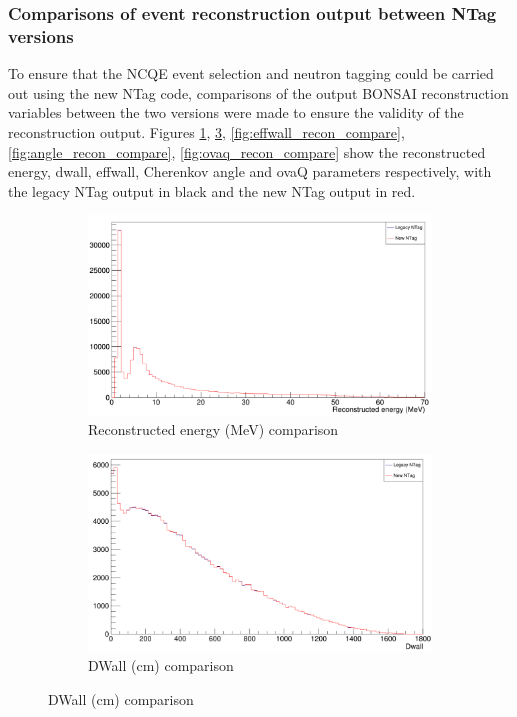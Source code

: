 \subsubsection{Comparisons of event reconstruction output between NTag versions}
To ensure that the NCQE event selection and neutron tagging could be carried out using the new NTag code, comparisons of the output BONSAI reconstruction variables between the two versions were made to ensure the validity of the reconstruction output. Figures \ref{fig:energy_recon_compare}, \ref{fig:dwall_recon_compare}, \ref{fig:effwall_recon_compare}, \ref{fig:angle_recon_compare}, \ref{fig:ovaq_recon_compare} show the reconstructed energy, dwall, effwall, Cherenkov angle and ovaQ parameters respectively, with the legacy NTag output in black and the new NTag output in red. 

\begin{figure}[t!] %
    \begin{subfigure}{0.48\textwidth}
    \includegraphics[width=\linewidth]{Figures/energy_recon_compare.PNG}
    \caption{Reconstructed energy (MeV) comparison} \label{fig:energy_recon_compare}
    \end{subfigure}\hspace*{\fill}
    \begin{subfigure}{0.48\textwidth}
    \includegraphics[width=\linewidth]{Figures/dwall_recon_compare.PNG}
    \caption{DWall (cm) comparison} \label{fig:dwall_recon_compare}
    \end{subfigure}
    

\end{figure}
